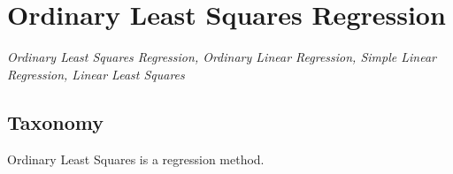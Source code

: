
\section{Ordinary Least Squares Regression} 
\label{sec:ordinary}

\emph{Ordinary Least Squares Regression, Ordinary Linear Regression, Simple Linear Regression, Linear Least Squares}

\subsection{Taxonomy}
Ordinary Least Squares is a regression method.


